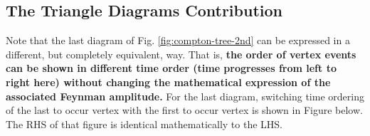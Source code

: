 \subsection{The Triangle Diagrams Contribution}
Note that the last diagram of Fig. \ref{fig:compton-tree-2nd} can be expressed in a different, but completely equivalent, way. That is, \textbf{the order of vertex events can be shown in different time order (time progresses from left to right here) without changing the mathematical expression of the associated Feynman amplitude.} For the last diagram, switching time ordering of the last to occur vertex with the first to occur vertex is shown in Figure below. The RHS of that figure is identical mathematically to the LHS.
\begin{figure}[H]
    \centering
{} %

\begin{tikzpicture}[x=0.75pt,y=0.75pt,yscale=-1,xscale=1]


\end{tikzpicture}
\end{figure}
